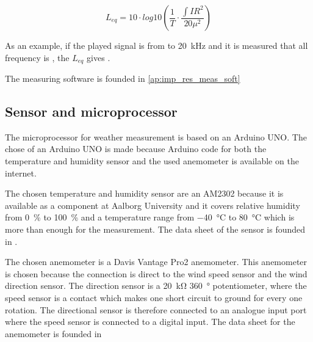 \begin{equation}\label{topd:leq}
L_{eq} = 10 \cdot log10 \left ( \frac{1}{T} \cdot \frac{\int IR^2}{20\mu^2 } \right )
\end{equation}

\startexplain
{}
\stopexplain

As an example, if the played signal is from  to \SI{20}{\kilo\hertz} and it is measured that all frequency is , the $L_{eq}$ gives .

The measuring software is founded in  \autoref{ap:imp_res_meas_soft}


\subsection{Sensor and microprocessor}\label{des:sensor_mic}
The microprocessor for weather measurement is based on an Arduino UNO. The chose of an Arduino UNO is made because Arduino code for both the temperature and humidity sensor and the used anemometer is available on the internet.  

The chosen temperature and humidity sensor are an AM2302 because it is available as a component at Aalborg University and it covers relative humidity from \SI{0}{\percent} to \SI{100}{\percent} and a temperature range from \SI{-40}{\celsius} to \SI{80}{\celsius} which is more than enough for the measurement. The data sheet of the sensor is founded in \citep{temp_sens}.


The chosen anemometer is a Davis Vantage Pro2 anemometer. This anemometer is chosen because the connection is direct to the wind speed sensor and the wind direction sensor. The direction sensor is a \SI{20}{\kilo\ohm} \SI{360}{\degree} potentiometer, where the speed sensor is a contact which makes one short circuit to ground for every one rotation. The directional sensor is therefore connected to an analogue input port where the speed sensor is connected to a digital input. The data sheet for the anemometer is founded in \citep{anemometer_sens}



